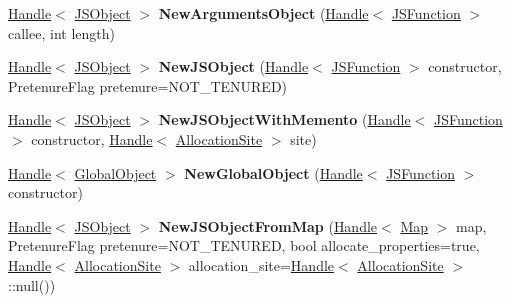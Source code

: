 \begin{DoxyCompactItemize}
\item 
\hypertarget{classv8_1_1internal_1_1_v8___f_i_n_a_l_a902a5895051b8a514993d022e732b742}{}\hyperlink{classv8_1_1internal_1_1_handle}{Handle}$<$ \hyperlink{classv8_1_1internal_1_1_j_s_object}{J\+S\+Object} $>$ {\bfseries New\+Arguments\+Object} (\hyperlink{classv8_1_1internal_1_1_handle}{Handle}$<$ \hyperlink{classv8_1_1internal_1_1_j_s_function}{J\+S\+Function} $>$ callee, int length)\label{classv8_1_1internal_1_1_v8___f_i_n_a_l_a902a5895051b8a514993d022e732b742}

\item 
\hypertarget{classv8_1_1internal_1_1_v8___f_i_n_a_l_a0d7475e934ae1c797ecc154ca414f7c5}{}\hyperlink{classv8_1_1internal_1_1_handle}{Handle}$<$ \hyperlink{classv8_1_1internal_1_1_j_s_object}{J\+S\+Object} $>$ {\bfseries New\+J\+S\+Object} (\hyperlink{classv8_1_1internal_1_1_handle}{Handle}$<$ \hyperlink{classv8_1_1internal_1_1_j_s_function}{J\+S\+Function} $>$ constructor, Pretenure\+Flag pretenure=N\+O\+T\+\_\+\+T\+E\+N\+U\+R\+E\+D)\label{classv8_1_1internal_1_1_v8___f_i_n_a_l_a0d7475e934ae1c797ecc154ca414f7c5}

\item 
\hypertarget{classv8_1_1internal_1_1_v8___f_i_n_a_l_a85690527ca8af197d51194eafac8bf32}{}\hyperlink{classv8_1_1internal_1_1_handle}{Handle}$<$ \hyperlink{classv8_1_1internal_1_1_j_s_object}{J\+S\+Object} $>$ {\bfseries New\+J\+S\+Object\+With\+Memento} (\hyperlink{classv8_1_1internal_1_1_handle}{Handle}$<$ \hyperlink{classv8_1_1internal_1_1_j_s_function}{J\+S\+Function} $>$ constructor, \hyperlink{classv8_1_1internal_1_1_handle}{Handle}$<$ \hyperlink{classv8_1_1internal_1_1_allocation_site}{Allocation\+Site} $>$ site)\label{classv8_1_1internal_1_1_v8___f_i_n_a_l_a85690527ca8af197d51194eafac8bf32}

\item 
\hypertarget{classv8_1_1internal_1_1_v8___f_i_n_a_l_a44b7cc4dac0c9c1496a7b636b0ee808d}{}\hyperlink{classv8_1_1internal_1_1_handle}{Handle}$<$ \hyperlink{classv8_1_1internal_1_1_global_object}{Global\+Object} $>$ {\bfseries New\+Global\+Object} (\hyperlink{classv8_1_1internal_1_1_handle}{Handle}$<$ \hyperlink{classv8_1_1internal_1_1_j_s_function}{J\+S\+Function} $>$ constructor)\label{classv8_1_1internal_1_1_v8___f_i_n_a_l_a44b7cc4dac0c9c1496a7b636b0ee808d}

\item 
\hypertarget{classv8_1_1internal_1_1_v8___f_i_n_a_l_aa76738df26ed6f050d605e3510527a79}{}\hyperlink{classv8_1_1internal_1_1_handle}{Handle}$<$ \hyperlink{classv8_1_1internal_1_1_j_s_object}{J\+S\+Object} $>$ {\bfseries New\+J\+S\+Object\+From\+Map} (\hyperlink{classv8_1_1internal_1_1_handle}{Handle}$<$ \hyperlink{classv8_1_1internal_1_1_map}{Map} $>$ map, Pretenure\+Flag pretenure=N\+O\+T\+\_\+\+T\+E\+N\+U\+R\+E\+D, bool allocate\+\_\+properties=true, \hyperlink{classv8_1_1internal_1_1_handle}{Handle}$<$ \hyperlink{classv8_1_1internal_1_1_allocation_site}{Allocation\+Site} $>$ allocation\+\_\+site=\hyperlink{classv8_1_1internal_1_1_handle}{Handle}$<$ \hyperlink{classv8_1_1internal_1_1_allocation_site}{Allocation\+Site} $>$\+::null())\label{classv8_1_1internal_1_1_v8___f_i_n_a_l_aa76738df26ed6f050d605e3510527a79}


\end{DoxyCompactItemize}
